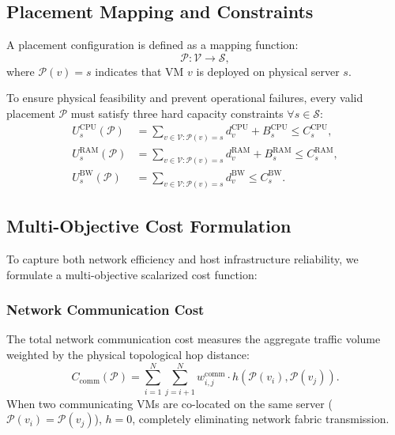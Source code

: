 \documentclass[conference]{IEEEtran}
\begin{document}
\subsection{Placement Mapping and Constraints}
A placement configuration is defined as a mapping function:
\begin{equation}
\mathcal{P}: \mathcal{V} \to \mathcal{S},
\end{equation}
where $\mathcal{P}(v) = s$ indicates that VM $v$ is deployed on physical server $s$.

To ensure physical feasibility and prevent operational failures, every valid placement $\mathcal{P}$ must satisfy three hard capacity constraints $\forall s \in \mathcal{S}$:
\begin{align}
\label{eq:cpu_constraint}
U_s^{\mathrm{CPU}}(\mathcal{P}) &= \sum_{v \in \mathcal{V} : \mathcal{P}(v) = s} d_v^{\mathrm{CPU}} + B_s^{\mathrm{CPU}} \le C_s^{\mathrm{CPU}}, \\
\label{eq:ram_constraint}
U_s^{\mathrm{RAM}}(\mathcal{P}) &= \sum_{v \in \mathcal{V} : \mathcal{P}(v) = s} d_v^{\mathrm{RAM}} + B_s^{\mathrm{RAM}} \le C_s^{\mathrm{RAM}}, \\
\label{eq:bw_constraint}
U_s^{\mathrm{BW}}(\mathcal{P}) &= \sum_{v \in \mathcal{V} : \mathcal{P}(v) = s} d_v^{\mathrm{BW}} \le C_s^{\mathrm{BW}}.
\end{align}

\subsection{Multi-Objective Cost Formulation}
To capture both network efficiency and host infrastructure reliability, we formulate a multi-objective scalarized cost function:

\subsubsection{Network Communication Cost}
The total network communication cost measures the aggregate traffic volume weighted by the physical topological hop distance:
\begin{equation}
C_{\mathrm{comm}}(\mathcal{P}) = \sum_{i=1}^{N} \sum_{j=i+1}^{N} w_{i,j}^{\mathrm{comm}} \cdot h\left(\mathcal{P}(v_i), \mathcal{P}(v_j)\right).
\end{equation}
When two communicating VMs are co-located on the same server ($\mathcal{P}(v_i) = \mathcal{P}(v_j)$), $h = 0$, completely eliminating network fabric transmission.
\end{document}
